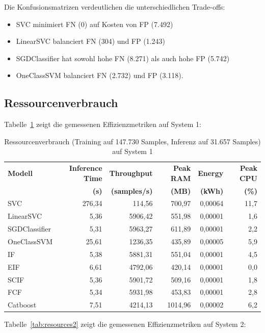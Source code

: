\documentclass[12pt,oneside]{article}
\begin{document}
	Die Konfusionsmatrizen verdeutlichen die unterschiedlichen Trade-offs:
	\begin{itemize}
		\item SVC minimiert FN (0) auf Kosten von FP (7.492)
		\item LinearSVC balanciert FN (304) und FP (1.243)
		\item SGDClassifier hat sowohl hohe FN (8.271) als auch hohe FP (5.742)
		 \item OneClassSVM balanciert FN (2.732) und FP (3.118).
	\end{itemize}
	\subsection{Ressourcenverbrauch}
	Tabelle~\ref{tab:resources1} zeigt die gemessenen Effizienzmetriken auf System 1:
	\FloatBarrier
	\begin{table}[h]
		\centering
		\caption{Ressourcenverbrauch (Training auf 147.730 Samples, Inferenz auf 31.657 Samples) auf System 1}
		\label{tab:resources1}
		\begin{tabular}{lrrrrr}
			\toprule
			\textbf{Modell} & \textbf{Inference Time} & \textbf{Throughput} & \textbf{Peak RAM} & \textbf{Energy} & \textbf{Peak CPU} \\
			& \textbf{(s)}           & \textbf{(samples/s)} & \textbf{(MB)} & \textbf{(kWh)} & \textbf{(\%)} \\
			\midrule
			SVC           & 276,34 & 114,56  &  700,97 & 0,00064 & 11,7 \\
			LinearSVC     & 5,36   & 5906,42 &  551,98 & 0,00001 & 1,6 \\
			SGDClassifier & 5,31   & 5963,27 &  611,89 & 0,00001 & 2,2 \\
			OneClassSVM   & 25,61  & 1236,35 &  435,89 & 0,00005 & 5,9 \\
			IF	 		  & 5,38   & 5881,31 &  551,04 & 0,00001 & 4,5 \\
			EIF	 		  & 6,61   & 4792,06 &  420,14 & 0,00001 & 0,0 \\
			SCIF	 	  & 5,36   & 5901,72 &  509,16 & 0,00001 & 1,8 \\
			FCF	 		  & 5,34   & 5931,98 &  453,83 & 0,00001 & 2,8 \\
			Catboost	  & 7,51   & 4214,13 & 1014,96 & 0,00002 & 6,2 \\
			\bottomrule
		\end{tabular}
	\end{table}
	\FloatBarrier
	Tabelle~\ref{tab:resources2} zeigt die gemessenen Effizienzmetriken auf System 2:
\end{document}
